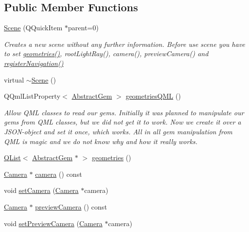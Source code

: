 \subsection*{Public Member Functions}
\begin{DoxyCompactItemize}
\item 
\hyperlink{class_scene_a93f88c89ce94ad70a668225522818b1e}{Scene} (Q\+Quick\+Item $\ast$parent=0)
\begin{DoxyCompactList}\small\item\em Creates a new scene without any further information.  Before use scene you have to set \hyperlink{class_scene_a65753673cd72f8b921cda3ac10c31e87}{geometries()}, root\+Light\+Ray(), camera(), preview\+Camera() and \hyperlink{class_scene_ace3407a4d148d317a20b1bf205554bc5}{register\+Navigation()} \end{DoxyCompactList}\item 
virtual \hyperlink{class_scene_a3b8cec2e32546713915f8c6303c951f1}{$\sim$\+Scene} ()
\item 
Q\+Qml\+List\+Property$<$ \hyperlink{class_abstract_gem}{Abstract\+Gem} $>$ \hyperlink{class_scene_ac437a983a495358875b319a4fcf912d4}{geometries\+Q\+M\+L} ()
\begin{DoxyCompactList}\small\item\em Allow Q\+M\+L classes to read our gems.  Initially it was planned to manipulate our gems from Q\+M\+L classes, but we did not get it to work. Now we create it over a J\+S\+O\+N-\/object and set it once, which works. All in all gem manipulation from Q\+M\+L is magic and we do not know why and how it really works. \end{DoxyCompactList}\item 
\hyperlink{singleton_q_list}{Q\+List}$<$ \hyperlink{class_abstract_gem}{Abstract\+Gem} $\ast$ $>$ \hyperlink{class_scene_a65753673cd72f8b921cda3ac10c31e87}{geometries} ()
\item 
\hyperlink{class_camera}{Camera} $\ast$ \hyperlink{class_scene_a81b014ae882dfaec147d917b1ea99d68}{camera} () const 
\item 
void \hyperlink{class_scene_a4c722c43b266a642a4a06d0d818b14d1}{set\+Camera} (\hyperlink{class_camera}{Camera} $\ast$camera)
\item 
\hyperlink{class_camera}{Camera} $\ast$ \hyperlink{class_scene_acdd91b41ac71a9e44b6e9883a30a1c48}{preview\+Camera} () const 
\item 
void \hyperlink{class_scene_a84120dfbddf207c955e16b7aae975b8c}{set\+Preview\+Camera} (\hyperlink{class_camera}{Camera} $\ast$camera)

\end{DoxyCompactItemize}
